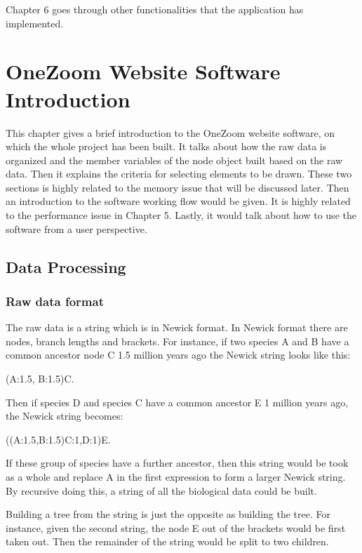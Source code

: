 \documentclass[MSc]{icldt}
\begin{document}
Chapter 6 goes through other functionalities that the application has implemented.
 

\chapter{OneZoom Website Software Introduction}

This chapter gives a brief introduction to the OneZoom website software, on which the whole project has been built. It talks about how the raw data is organized and the member variables of the node object built based on the raw data. Then it explains the criteria for selecting elements to be drawn. These two sections is highly related to the memory issue that will be discussed later. Then an introduction to the software working flow would be given. It is highly related to the performance issue in Chapter 5. Lastly, it would talk about how to use the software from a user perspective.

\section{Data Processing}

\subsection{Raw data format}

The raw data is a string which is in Newick format. In Newick format there are nodes, branch lengths and brackets. For instance, if two species A and B have a common ancestor node C 1.5 million years ago the Newick string looks like this: 
\begin{center}
	(A:1.5, B:1.5)C. 
\end{center}

Then if species D and species C have a common ancestor E 1 million years ago, the Newick string becomes: 
\begin{center}
	((A:1.5,B:1.5)C:1,D:1)E. 
\end{center}
If these group of species have a further ancestor, then this string would be took as a whole and replace A in the first expression to form a larger Newick string. By recursive doing this, a string of all the biological data could be built. 

Building a tree from the string is just the opposite as building the tree. For instance, given the second string, the node E out of the brackets would be first taken out. Then the remainder of the string would be split to two children.
\end{document}
